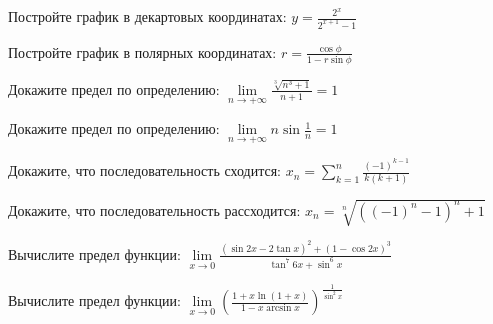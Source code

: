 \documentclass[russian]{article}
\begin{document}
Постройте график в декартовых координатах:
$y = \frac{2^x}{2^{x + 1} - 1}$

Постройте график в полярных координатах:
$r = \frac{\cos\phi}{1 - r\sin\phi}$

Докажите предел по определению:
$\lim\limits_{n \to +\infty} \frac{\sqrt[3]{n^3 + 1}}{n + 1} = 1$

Докажите предел по определению:
$\lim\limits_{n \to +\infty} n\sin\frac{1}{n} = 1$

Докажите, что последовательность сходится:
$x_n = \sum_{k = 1}^n \frac{(-1)^{k - 1}}{k(k + 1)}$

Докажите, что последовательность рассходится:
$x_n = \sqrt[n]{((-1)^n - 1)^n + 1}$

Вычислите предел функции:
$\lim\limits_{x \to 0} \frac{(\sin2x - 2 \tan x)^2 + (1 - \cos2x)^3}{\tan^7 6x + \sin^6 x}$

Вычислите предел функции:
$\lim\limits_{x \to 0} \left(\frac{1 + x\ln(1 + x)}{1 - x\arcsin x} \right)^\frac{1}{\sin^2 x}$
\end{document}
